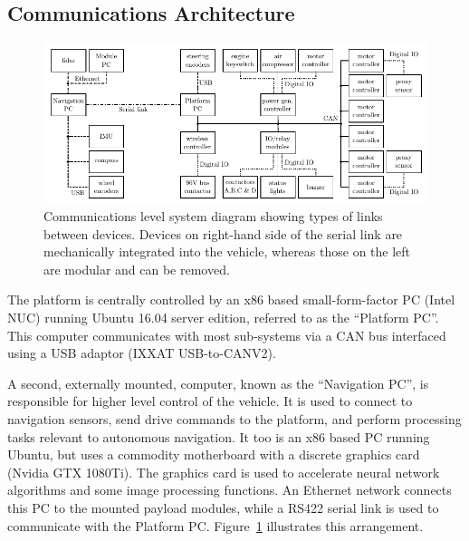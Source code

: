 \documentclass[preprint,authoryear,12pt]{elsarticle}
\begin{document}
    \subsection{Communications Architecture}
    \label{sect:architecture}

        \begin{figure}[htb]
            \centering
            \includegraphics[width=\linewidth]{imgs/system_diagram/diagram_v5.pdf}
            \caption{
                Communications level system diagram showing types of links between devices.
                Devices on right-hand side of the serial link are mechanically integrated into the vehicle, whereas those on the left are modular and can be removed.
            }
            \label{fig:system_diagram}
        \end{figure}

        The platform is centrally controlled by an x86 based small-form-factor PC (Intel NUC) running Ubuntu 16.04 server edition, referred to as the ``Platform PC''.
        This computer communicates with most sub-systems via a CAN bus interfaced using a USB adaptor (IXXAT USB-to-CANV2).

        A second, externally mounted, computer, known as the ``Navigation PC'', is responsible for higher level control of the vehicle.
        It is used to connect to navigation sensors, send drive commands to the platform, and perform processing tasks relevant to autonomous navigation.
        It too is an x86 based PC running Ubuntu, but uses a commodity motherboard with a discrete graphics card (Nvidia GTX 1080Ti).
        The graphics card is used to accelerate neural network algorithms and some image processing functions.
        An Ethernet network connects this PC to the mounted payload modules, while a RS422 serial link is used to communicate with the Platform PC.
        Figure~\ref{fig:system_diagram} illustrates this arrangement.
\end{document}
